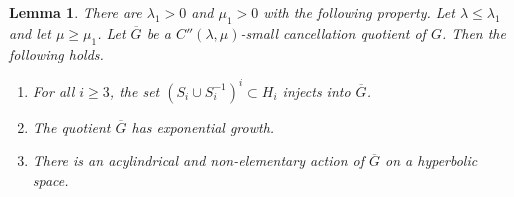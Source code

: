 \documentclass[leqno,a4paper,10pt]{amsart}
\theoremstyle{plain}
\newtheorem{lem}[thm]{Lemma}
\theoremstyle{definition}
\theoremstyle{remark}
\begin{document}
\begin{lem}\label{L:common-quotient-injection} There are $\lambda_1>0$ and $\mu_1>0$ with the following property.  Let $\lambda \leqslant \lambda_1$ and let $\mu\geqslant \mu_1$. Let $\overline G$ be a $C''(\lambda,\mu)$-small cancellation quotient of $G$. Then the following holds. 
\begin{enumerate}
\item For all $i\geqslant 3$, the set $(S_i\cup S_i^{-1})^i\subset H_i$ injects into $\overline G$.
\item The quotient $\overline G$ has exponential growth.
\item There is an acylindrical and non-elementary action of $\overline G$ on a hyperbolic space. 
\end{enumerate}  
\end{lem}
\end{document}
